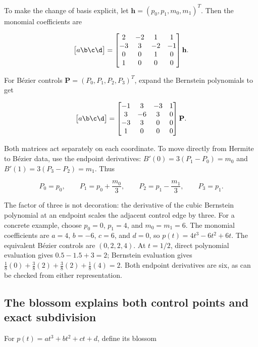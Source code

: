To make the change of basis explicit, let \(\mathbf{h}=(p_0,p_1,m_0,m_1)^T\). Then the monomial coefficients are

\[
\begin{bmatrix}a\b\c\d\end{bmatrix}=
\begin{bmatrix}
2&-2&1&1\\
-3&3&-2&-1\\
0&0&1&0\\
1&0&0&0
\end{bmatrix}\mathbf{h}.
\]

For Bézier controls \(\mathbf{P}=(P_0,P_1,P_2,P_3)^T\), expand the Bernstein polynomials to get

\[
\begin{bmatrix}a\b\c\d\end{bmatrix}=
\begin{bmatrix}
-1&3&-3&1\\
3&-6&3&0\\
-3&3&0&0\\
1&0&0&0
\end{bmatrix}\mathbf{P}.
\]

Both matrices act separately on each coordinate. To move directly from Hermite to Bézier data, use the endpoint derivatives: \(B'(0)=3(P_1-P_0)=m_0\) and \(B'(1)=3(P_3-P_2)=m_1\). Thus

\[
P_0=p_0,\qquad P_1=p_0+\frac{m_0}{3},\qquad
P_2=p_1-\frac{m_1}{3},\qquad P_3=p_1.
\]

The factor of three is not decoration: the derivative of the cubic Bernstein polynomial at an endpoint scales the adjacent control edge by three. For a concrete example, choose \(p_0=0\), \(p_1=4\), and \(m_0=m_1=6\). The monomial coefficients are \(a=4\), \(b=-6\), \(c=6\), and \(d=0\), so \(p(t)=4t^3-6t^2+6t\). The equivalent Bézier controls are \((0,2,2,4)\). At \(t=1/2\), direct polynomial evaluation gives \(0.5-1.5+3=2\); Bernstein evaluation gives \(\frac18(0)+\frac38(2)+\frac38(2)+\frac18(4)=2\). Both endpoint derivatives are six, as can be checked from either representation.

\subsection{The blossom explains both control points and exact subdivision}\label{03-visual-computing-i-ch001-the-blossom-explains-both-control-points-and-exact-subdivision}

For \(p(t)=at^3+bt^2+ct+d\), define its blossom

